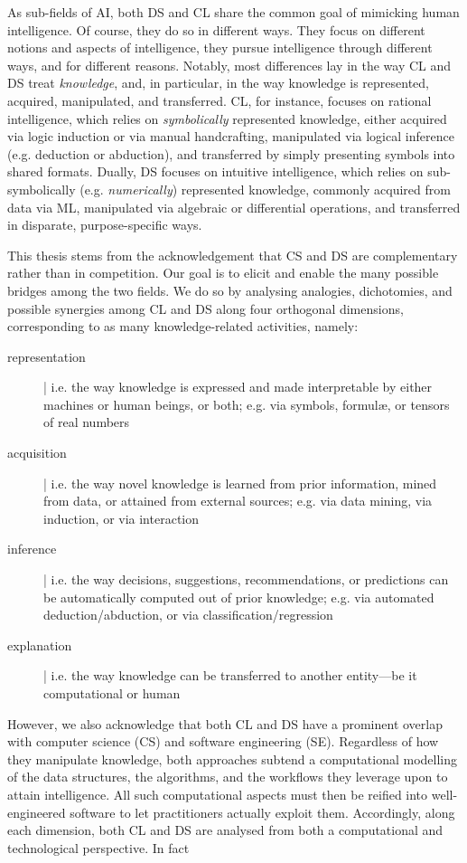 \documentclass[12pt,a4paper,openright,twoside]{book}
\begin{document}
As sub-fields of AI, both DS and CL share the common goal of mimicking human intelligence.
%
Of course, they do so in different ways.
%
They focus on different notions and aspects of intelligence, they pursue intelligence through different ways, and for different reasons.
%
Notably, most differences lay in the way CL and DS treat \emph{knowledge}, and, in particular, in the way knowledge is represented, acquired, manipulated, and transferred.
%
CL, for instance, focuses on rational intelligence, which relies on \emph{symbolically} represented knowledge, either acquired via logic induction or via manual handcrafting, manipulated via logical inference (e.g. deduction or abduction), and transferred by simply presenting symbols into shared formats.
%
Dually, DS focuses on intuitive intelligence, which relies on sub-symbolically (e.g. \emph{numerically}) represented knowledge, commonly acquired from data via ML, manipulated via algebraic or differential operations, and transferred in disparate, purpose-specific ways.

This thesis stems from the acknowledgement that CS and DS are complementary rather than in competition.
%
Our goal is to elicit and enable the many possible bridges among the two fields.
%
We do so by analysing analogies, dichotomies, and possible synergies among CL and DS along four orthogonal dimensions, corresponding to as many knowledge-related activities, namely:
%
\begin{description}
    \item[representation] | i.e. the way knowledge is expressed and made interpretable by either machines or human beings, or both; e.g. via symbols, formul\ae, or tensors of real numbers 
    \item[acquisition] | i.e. the way novel knowledge is learned from prior information, mined from data, or attained from external sources; e.g. via data mining, via induction, or via interaction 
    \item[inference] |  i.e. the way decisions, suggestions, recommendations, or predictions can be automatically computed out of prior knowledge; e.g. via automated deduction/abduction, or via classification/regression
    \item[explanation] | i.e. the way knowledge can be transferred to another entity---be it computational or human
\end{description}

However, we also acknowledge that both CL and DS have a prominent overlap with computer science (CS) and software engineering (SE).
%
Regardless of how they manipulate knowledge, both approaches subtend a computational modelling of the data structures, the algorithms, and the workflows they leverage upon to attain intelligence.
%
All such computational aspects must then be reified into well-engineered software to let practitioners actually exploit them. 
%
Accordingly, along each dimension, both CL and DS are analysed from both a computational and technological perspective.
%
In fact 
\end{document}
